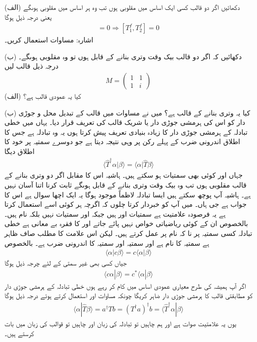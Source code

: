 (الف) دکھائیں اگر دو قالب کسی ایک اساس میں مقلوبی ہوں تب وہ ہر اساس میں مقلوبی ہوںگے یعنی درجہ ذیل ہوگا
\begin{align}
	[T^e_1, T^e_2] = 0 \Rightarrow [T^f_1, T^f_2] = 0
\end{align}
اشارہ: مساوات  استعمال کریں۔

(ب) دکھائیں کہ اگر دو قالب بیک وقت وتری بنانے کے قابل ہوں تو وہ مقلوبی ہوںگے۔
درجہ ذیل قالب لیں
\begin{align*}
	M=
	\begin{pmatrix}
		1 & 1\\
		1 & i
	\end{pmatrix}
\end{align*}
(الف) کیا یہ عمودی قالب ہے؟

(ب) کیا یہ وتری بنانے کے قالب ہے؟
میں نے مساوات  میں قالب کے تبدیل محل و جوڑی دار  کو اس کی ہرمشی جوڑی دار یا شریک قالب کی تعریف قرار دیا۔ یہاں میں خطی تبادلہ کے ہرمشی جوڑی دار کا زیادہ بنیادی تعریف پیش کرتا ہوں یہ وہ تبادلہ  ہے جس کا اطلاق اندرونی ضرب کے پہلے رکن پر وہی نتیجہ دیتا ہے جو دوسرے سمتیہ پر خود  کا اطلاق دیگا
\begin{align}
	\langle\hat{T}^{\dagger}\alpha|\beta\rangle = \langle\alpha|\hat{T}\beta\rangle
\end{align}
جہاں  اور  کوئی بھی سمتیات ہو سکتے ہیں۔ ہاشیہ اس کا مقابل اگر دو وتری بنانے کے قالب مقلوبی ہوں تب وہ بیک وقت وتری بنانے کے قابل ہوںگے ثابت کرنا اتنا آسان نہیں ہے۔ ہاشیہ آپ پوچھ سکتے ہیں ایسا تبادلہ لاظماً موجود ہوگا یہ ایک اچھا سوال ہے اس کا جواب ہے جی ہاں۔ میں آپ کو خبردار کرتا چلوں کہ اگرچہ ہر کوئی اسے استعمال کرتا ہے یہ فرصودہ علامتیت ہے سمتیات  اور  ہیں جبکہ  اور  سمتیات نہیں بلکہ نام ہیں۔ بالخصوص ان کے کوئی ریاضیاتی خواص نہیں پائے جاتے اور  کا فقرہ بے معانی ہے خطی تبادلہ کسی سمتیہ پر نا کہ نام پر عمل کرتے ہیں۔ لیکن اس علامت کا مطلب صاف ظاہر ہے سمتیہ  کا نام  ہے اور سمتیہ  اور سمتیہ  کا اندرونی ضرب  ہے۔ بالخصوص
\begin{align}
	\langle\alpha| c\beta\rangle = c\langle\alpha|\beta\rangle
\end{align}
جیاں کسی بھی غیر سمتی  کے لئے چرجہ ذیل ہوگا
\begin{align}
	\langle c\alpha|\beta\rangle = c^{*}\langle\alpha|\beta\rangle
\end{align}
اگر آپ ہمیشہ کی طرح معیاری عمودی اساس میں کام کر رہے ہوں خطی تبادلہ کے ہرمشی جوڑی دار کو مطابقتی قالب کا ہرمشی جوڑی دار ضاہر کریگا چونکہ مساوات  اور  استعمال کرتے ہوئے درجہ ذیل ہوگا
\begin{align}
	\langle\alpha|\hat{T}\beta\rangle = a^\dagger Tb = (T^\dagger a)^\dagger b = \langle\hat{T}^\dagger\alpha|\beta\rangle
\end{align}
یوں یہ علامتیت صوات ہے اور ہم چاہیں تو تبادلہ کی زبان اور چاہیں تو قوالب کی زبان میں بات کرستے ہیں۔

